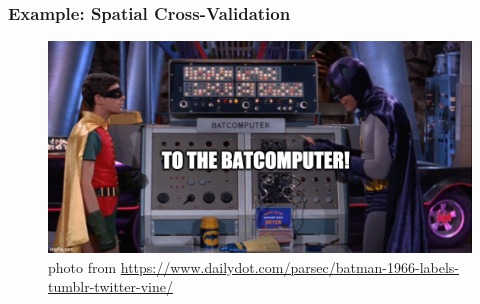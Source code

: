 \documentclass[
  shownotes,
  xcolor={svgnames},
  hyperref={colorlinks,citecolor=DarkBlue,linkcolor=andesred,urlcolor=DarkBlue}
  , aspectratio=169]{beamer}
\begin{document}
\begin{frame}[fragile]
\frametitle{Example: Spatial Cross-Validation}
\begin{figure}[H] \centering
  \centering
  \includegraphics[scale=0.35]{figures/baticomputer_meme.jpg}
  \\
  \tiny photo from \url{https://www.dailydot.com/parsec/batman-1966-labels-tumblr-twitter-vine/}
\end{figure}


\end{frame}

\end{document}
